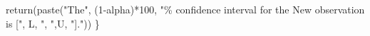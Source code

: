 \documentclass[
]{article}
\newenvironment{Shaded}{\begin{snugshade}}{\end{snugshade}}
\newcommand{\DecValTok}[1]{\textcolor[rgb]{0.00,0.00,0.81}{#1}}
\newcommand{\FunctionTok}[1]{\textcolor[rgb]{0.00,0.00,0.00}{#1}}
\newcommand{\NormalTok}[1]{#1}
\newcommand{\SpecialCharTok}[1]{\textcolor[rgb]{0.00,0.00,0.00}{#1}}
\newcommand{\StringTok}[1]{\textcolor[rgb]{0.31,0.60,0.02}{#1}}
\begin{document}
\begin{Shaded}
\begin{Highlighting}[]
  \FunctionTok{return}\NormalTok{(}\FunctionTok{paste}\NormalTok{(}\StringTok{"The"}\NormalTok{, (}\DecValTok{1}\SpecialCharTok{{-}}\NormalTok{alpha)}\SpecialCharTok{*}\DecValTok{100}\NormalTok{, }\StringTok{"\% confidence interval for the New observation is ["}\NormalTok{, L, }\StringTok{", "}\NormalTok{,U, }\StringTok{"]."}\NormalTok{))}
\NormalTok{\}}
\end{Highlighting}
\end{Shaded}
\end{document}
